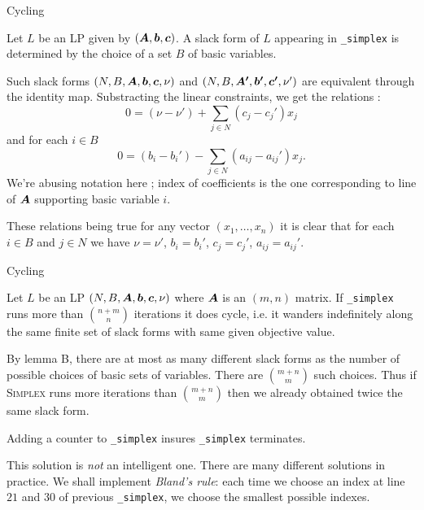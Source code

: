 \documentclass[aspectratio = 169]{beamer}
\begin{document}
    \begin{frame}{Cycling}
        \begin{lem}[$\bs{B}$]
          Let $L$ be an LP given by $(\boldsymbol{A}, \boldsymbol{b}, \boldsymbol{c})$. A
          slack form of $L$ appearing in \texttt{_simplex}
          is determined by the choice of a set $B$ of basic variables.
        \end{lem}
        \pause
        \setlength\columnseprule{.1pt}
        \begin{multicols}{2}
            \begin{demo}
              Such slack forms $(N, B, \boldsymbol{A}, \boldsymbol{b}, \boldsymbol{c}, \nu)$
              and $(N, B, \boldsymbol{A'}, \boldsymbol{b'}, \boldsymbol{c'}, \nu')$ are
              equivalent through the identity map.  \pause
              Substracting the linear constraints, we get the
              relations :
              \[
              0 = (\nu - \nu') + \sum_{j \in N} (c_j - c_j')x_j
              \]
              and for each $i \in B$
              \[
              0 = (b_i - b_i') - \sum_{j \in N} (a_{ij} - a_{ij}')x_j.
              \]
              We're abusing notation here ; index of coefficients is
              the one corresponding to line of $\boldsymbol{A}$ supporting
              basic variable $i$.

              \pause These relations being true for any vector
              $(x_1, \ldots, x_n)$ it is clear that for each $i \in B$
              and $j \in N$ we have  $\nu = \nu'$, $b_i = b_i'$, $c_j = c_j'$,
              $a_{ij} = a_{ij}'$.
            \end{demo}
        \end{multicols}
    \end{frame}

\begin{frame}{Cycling}
  \begin{prop}[\textbf{C}]
    Let $L$ be an LP $(N, B, \boldsymbol{A}, \boldsymbol{b}, \boldsymbol{c}, \nu)$ where
    $\boldsymbol{A}$ is an $(m, n)$ matrix. If \texttt{_simplex}
    runs more than $\binom{n+m}{n}$ iterations it does cycle, i.e. it
    wanders indefinitely along the same finite set of slack forms with
    same given objective value.
  \end{prop}
  \begin{demo}
    By lemma B, there are at most as many different slack forms
    as the number of possible choices of basic sets of
    variables. There are $\binom{m+n}{m}$ such choices. Thus if
    \textsc{Simplex} runs more iterations than $\binom{m+n}{m}$
    then we already obtained twice the same slack form.
  \end{demo}
  \pause
  Adding a counter to \texttt{_simplex} insures
  \texttt{_simplex} terminates.

  \pause
  \begin{rem}
    This solution is \alert{\emph{not}} an intelligent one. There are
    many different solutions in practice.  We shall implement
    \emph{Bland's rule}: each time we choose an index at line $21$ and
    $30$ of previous \texttt{_simplex}, we choose the
    smallest possible indexes.
  \end{rem}
\end{frame}
\end{document}
